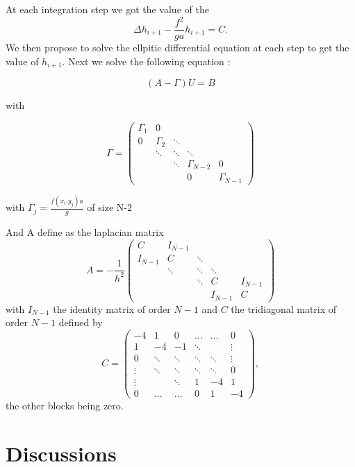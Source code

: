 \documentclass[11pt,a4paper]{report}
\begin{document}
\begin{multicols*}{2}
    At each integration step we got the value of the $$\Delta h_{i+1} - \frac{f^2}{ga} h_{i+1} = C.$$ We then propose to solve the ellpitic differential equation at each step to get the value of  $ h_{i+1}$. Next we solve the following equation :

    \begin{equation}
        (A -\Gamma)U = B
    \end{equation}

    with


    \begin{equation}
        \Gamma = \begin{pmatrix}\Gamma_1&0\\0&\Gamma_2&\ddots\\&\ddots&\ddots&\ddots\\&&\ddots&\Gamma_{N-2}&0\\&&&0& \Gamma_{N-1}\end{pmatrix}
    \end{equation}


    with $\Gamma_j = \frac{f(x_i. y_j)a}{g}$ of size N-2

    And A define as the laplacian matrix
    $$
        A=-\frac{1}{h^2}\begin{pmatrix}C&I_{N-1}\\I_{N-1}&C&\ddots\\&\ddots&\ddots&\ddots\\&&\ddots&C&I_{N-1}\\&&&I_{N-1}&C\end{pmatrix}
    $$
    with $I_{N-1}$ the identity matrix of order $N-1$ and $C$ the tridiagonal matrix of order $N-1$ defined by
    $$
        C=\begin{pmatrix}-4&1&0&\dots&\dots&0\\1&-4&-1&\ddots&&\vdots\\0&\ddots&\ddots&\ddots&\ddots&\vdots\\\vdots&\ddots&\ddots&\ddots&\ddots&0\\\vdots&&\ddots&1&-4&1\\0&\dots&\dots&0&1&-4\end{pmatrix},
    $$
    the other blocks being zero.



    \chapter{Discussions}


\end{multicols*}
\end{document}
